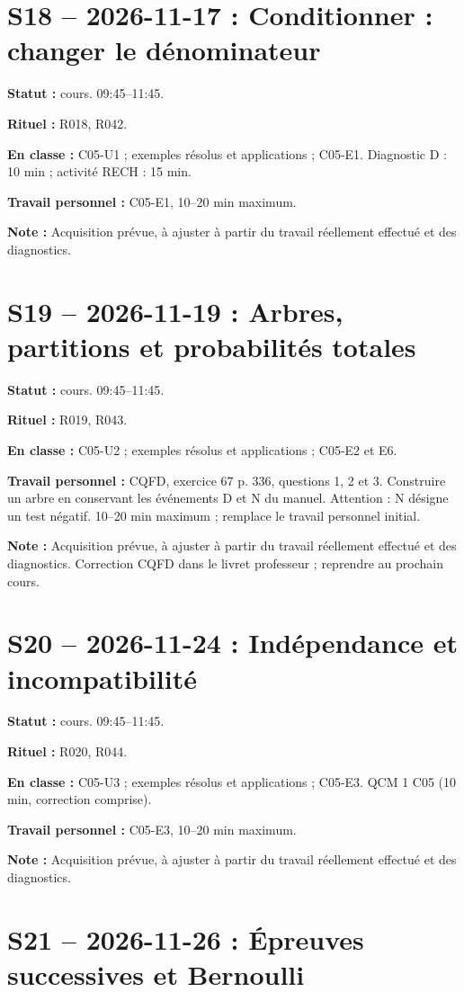 \section*{S18 -- 2026-11-17 : Conditionner : changer le dénominateur}
\textbf{Statut :} cours. 09:45–11:45.\par\textbf{Rituel :} R018, R042.\par\textbf{En classe :} C05-U1 ; exemples résolus et applications ; C05-E1. Diagnostic D : 10 min ; activité RECH : 15 min.\par\textbf{Travail personnel :} C05-E1, 10–20 min maximum.\par\textbf{Note :} Acquisition prévue, à ajuster à partir du travail réellement effectué et des diagnostics.
\section*{S19 -- 2026-11-19 : Arbres, partitions et probabilités totales}
\textbf{Statut :} cours. 09:45–11:45.\par\textbf{Rituel :} R019, R043.\par\textbf{En classe :} C05-U2 ; exemples résolus et applications ; C05-E2 et E6. \par\textbf{Travail personnel :} CQFD, exercice 67 p. 336, questions 1, 2 et 3. Construire un arbre en conservant les événements D et N du manuel. Attention : N désigne un test négatif. 10–20 min maximum ; remplace le travail personnel initial.\par\textbf{Note :} Acquisition prévue, à ajuster à partir du travail réellement effectué et des diagnostics. Correction CQFD dans le livret professeur ; reprendre au prochain cours.
\section*{S20 -- 2026-11-24 : Indépendance et incompatibilité}
\textbf{Statut :} cours. 09:45–11:45.\par\textbf{Rituel :} R020, R044.\par\textbf{En classe :} C05-U3 ; exemples résolus et applications ; C05-E3.  QCM 1 C05 (10 min, correction comprise).\par\textbf{Travail personnel :} C05-E3, 10–20 min maximum.\par\textbf{Note :} Acquisition prévue, à ajuster à partir du travail réellement effectué et des diagnostics.
\section*{S21 -- 2026-11-26 : Épreuves successives et Bernoulli}
